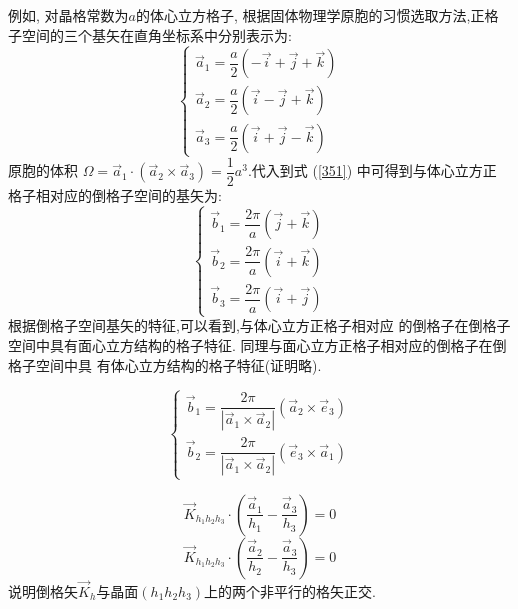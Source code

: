 \documentclass[UTF8,10pt, a4paper, oneside]{ctexart}
\begin{document}
    {例如, 对晶格常数为$a$的体心立方格子, 根据固体物理学原胞的习惯选取方法,正格子空间的三个基矢在直角坐标系中分别表示为:$$
        \left\{\begin{array}{l}
        \vec{a}_{1}=\dfrac{a}{2}(-\vec{i}+\vec{j}+\vec{k}) \\
        \vec{a}_{2}=\dfrac{a}{2}(\vec{i}-\vec{j}+\vec{k}) \\
        \vec{a}_{3}=\dfrac{a}{2}(\vec{i}+\vec{j}-\vec{k})
        \end{array}\right.
        $$
        原胞的体积 $\Omega=\vec{a}_{1} \cdot\left(\vec{a}_{2} \times \vec{a}_{3}\right)=\dfrac{1}{2} {a}^{3}$.代入到式 (\ref{351}) 中可得到与体心立方正 格子相对应的倒格子空间的基矢为:
        $$
        \left\{\begin{array}{l}
        \vec{b}_{1}=\dfrac{2 \pi}{a}(\vec{j}+\vec{k}) \\
        \vec{b}_{2}=\dfrac{2 \pi}{a}(\vec{i}+\vec{k}) \\
        \vec{b}_{3}=\dfrac{2 \pi}{a}(\vec{i}+\vec{j})
        \end{array}\right.
        $$根据倒格子空间基矢的特征,可以看到,与体心立方正格子相对应
        的倒格子在倒格子空间中具有面心立方结构的格子特征.
        同理与面心立方正格子相对应的倒格子在倒格子空间中具
        有体心立方结构的格子特征(证明略).}

    {\[\left\{\begin{array}{l}
            \vec{b}_{1}=\dfrac{2 \pi}{|\vec{a}_{1} \times \vec{a}_{2}|}(\vec{a}_{2} \times \vec{e}_{3}) \\
            \vec{b}_{2}=\dfrac{2 \pi}{|\vec{a}_{1} \times \vec{a}_{2}|}(\vec{e}_{3} \times \vec{a}_{1})
            \end{array}\right.\]}
  
    {\[\vec{K}_{h_{1} h_{2} h_{3}} \cdot(\dfrac{\vec{a}_{1}}{h_{1}}-\dfrac{\vec{a}_{3}}{h_{3}})=0\]
        \[\vec{K}_{h_{1} h_{2} h_{3}} \cdot(\dfrac{\vec{a}_{2}}{h_{2}}-\dfrac{\vec{a}_{3}}{h_{3}})=0
        \]说明倒格矢$\vec{K}_{h}$与晶面$(h_1h_2h_3)$上的两个非平行的格矢正交.}
\end{document}
